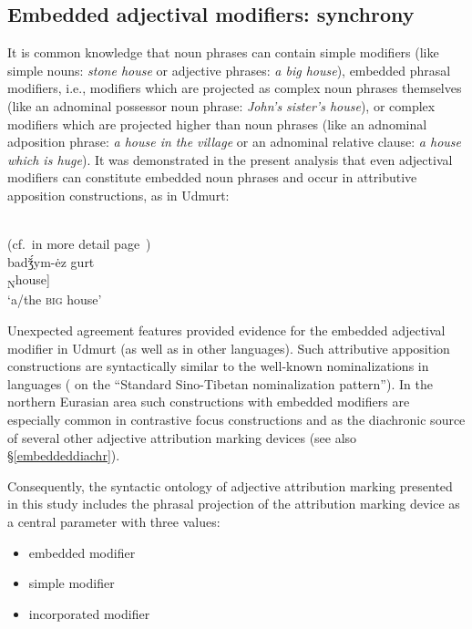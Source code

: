 \subsection{Embedded adjectival modifiers: synchrony}
\label{embeddedsynchr}
It is common knowledge that noun phrases can contain simple modifiers (like simple nouns: \textit{stone house} or adjective phrases: \textit{a big house}), embedded phrasal modifiers, i.e., modifiers which are projected as complex noun phrases themselves (like an adnominal possessor noun phrase: \textit{John's sister's house}), or complex modifiers which are projected higher than noun phrases (like an adnominal adposition phrase: \textit{a house in the village} or an adnominal relative clause: \textit{a house which is huge}). It was demonstrated in the present analysis that even adjectival modifiers can constitute embedded noun phrases and occur in attributive apposition constructions, as in Udmurt:
\begin{exe}
\\{\rm (cf.~in more detail page~\pageref{udmurt synchr})}\\
\gll	{}		{}		badǯ́ym-ėz gurt\\
	[\textsubscript{NP} 	[\textsubscript{NP'} \textsubscript{A}big-\textsc{nmlz}] \textsubscript{N}house]\\
\glt	‘a/the \textsc{big} house’
\end{exe}

Unexpected agreement features provided evidence for the embedded adjectival modifier in Udmurt (as well as in other languages). Such attributive apposition constructions are syntactically similar to the well-known nominalizations in  languages (\citealt[cf.][]{bickel1999} on the “Standard Sino-Tibetan nominalization pattern”). In the northern Eurasian area such constructions with embedded modifiers are especially  common in contrastive focus constructions and as the diachronic source of several other adjective attribution marking devices (see also \S\ref{embeddeddiachr}). 

Consequently, the syntactic ontology of adjective attribution marking presented in this study includes the phrasal projection of the attribution marking device as a central parameter with three values:
\begin{itemize}
\item embedded modifier
\item simple modifier
\item incorporated modifier
\end{itemize}

